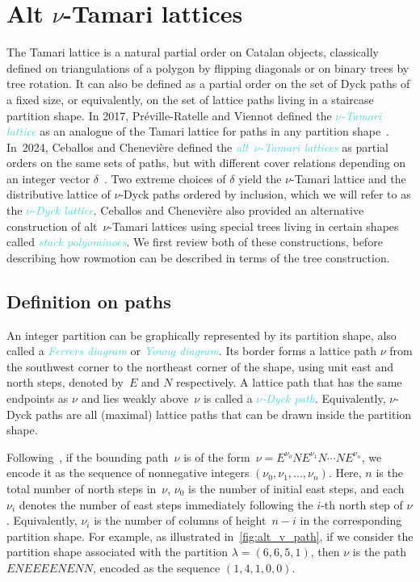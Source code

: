 \documentclass[11pt]{amsart}
\newcounter{height}
\newcommand{\dfn}[1]{\textcolor{Turquoise}{\emph{#1}}}
\theoremstyle{definition}
\begin{document}
\section{Alt \texorpdfstring{$\nu$}{nu}-Tamari lattices} \label{sec:alt} 

The Tamari lattice is a natural partial order on Catalan objects, classically defined on triangulations of a polygon by flipping diagonals or on binary trees by tree rotation. It can also be defined as a partial order on the set of Dyck paths of a fixed size, or equivalently, on the set of lattice paths living in a staircase partition shape.  In 2017, Pr\'eville-Ratelle and Viennot defined the \dfn{$\nu$-Tamari lattice} as an analogue of the Tamari lattice for paths in any partition shape~\cite{preville2017nutamari}. In~2024, Ceballos and Chenevi\`{e}re defined the \dfn{alt~$\nu$-Tamari lattices} as partial orders on the same sets of paths, but with different cover relations depending on an integer vector $\delta$~\cite{ceballos2024altnu}. Two extreme choices of $\delta$ yield the $\nu$-Tamari lattice and the distributive lattice of $\nu$-Dyck paths ordered by inclusion, which we will refer to as the \dfn{$\nu$-Dyck lattice}. Ceballos and Chenevi\`{e}re also provided an alternative construction of alt~$\nu$-Tamari lattices using special trees living in certain shapes called \dfn{stack polyominoes}. We first review both of these constructions, before describing how rowmotion can be described in terms of the tree construction.

\subsection{Definition on paths}

An integer partition can be graphically represented by its partition shape, also called a \dfn{Ferrers diagram} or \dfn{Young diagram}. Its border forms a lattice path $\nu$ from the southwest corner to the northeast corner of the shape, using unit east and north steps, denoted by~$E$ and $N$ respectively. A lattice path that has the same endpoints as $\nu$ and lies weakly above~$\nu$ is called a \dfn{$\nu$-Dyck path}. Equivalently, $\nu$-Dyck paths are all (maximal) lattice paths that can be drawn inside the partition shape.

Following~\cite{ceballos2024altnu}, if the bounding path~$\nu$ is of the form~$\nu = E^{\nu_0} N E^{\nu_1} N \cdots N E^{\nu_n}$, we encode it as the sequence of nonnegative integers $(\nu_0, \nu_1, \dots, \nu_n)$. Here, $n$ is the total number of north steps in~$\nu$, $\nu_0$ is the number of initial east steps, and each $\nu_i$ denotes the number of east steps immediately following the $i$-th north step of $\nu$. Equivalently, $\nu_i$ is the number of columns of height~$n-i$ in the corresponding partition shape. For example, as illustrated in~\cref{fig:alt_v_path}, if we consider the partition shape associated with the partition $\lambda = (6, 6, 5, 1)$, then $\nu$ is the path $ENEEEENENN$, encoded as the sequence $(1, 4, 1, 0, 0)$.
\end{document}
